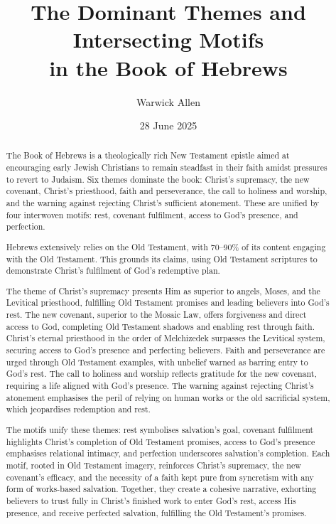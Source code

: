 \documentclass[12pt]{article}
\title{The Dominant Themes and Intersecting Motifs \\ in the Book of Hebrews}
\author{Warwick Allen}
\date{28 June 2025}
\begin{document}
\maketitle

\begin{abstract}
The Book of Hebrews is a theologically rich New Testament epistle aimed at
encouraging early Jewish Christians to remain steadfast in their faith amidst
pressures to revert to Judaism. Six themes dominate the book: Christ’s
supremacy, the new covenant, Christ’s priesthood, faith and perseverance, the
call to holiness and worship, and the warning against rejecting Christ’s
sufficient atonement. These are unified by four interwoven motifs: rest,
covenant fulfilment, access to God’s presence, and perfection.

Hebrews extensively relies on the Old Testament, with 70--90\% of its content
engaging with the Old Testament. This grounds its claims, using Old Testament
scriptures to demonstrate Christ’s fulfilment of God’s redemptive plan.

The theme of Christ’s supremacy presents Him as superior to angels, Moses, and
the Levitical priesthood, fulfilling Old Testament promises and leading
believers into God’s rest. The new covenant, superior to the Mosaic Law, offers
forgiveness and direct access to God, completing Old Testament shadows and
enabling rest through faith. Christ’s eternal priesthood in the order of
Melchizedek surpasses the Levitical system, securing access to God’s presence
and perfecting believers. Faith and perseverance are urged through Old
Testament examples, with unbelief warned as barring entry to God’s rest. The
call to holiness and worship reflects gratitude for the new covenant, requiring
a life aligned with God’s presence. The warning against rejecting Christ’s
atonement emphasises the peril of relying on human works or the old sacrificial
system, which jeopardises redemption and rest.

The motifs unify these themes: rest symbolises salvation’s goal, covenant
fulfilment highlights Christ’s completion of Old Testament promises, access to
God’s presence emphasises relational intimacy, and perfection underscores
salvation’s completion. Each motif, rooted in Old Testament imagery, reinforces
Christ’s supremacy, the new covenant’s efficacy, and the necessity of a faith
kept pure from syncretism with any form of works-based salvation. Together, they
create a cohesive narrative, exhorting believers to trust fully in Christ’s
finished work to enter God’s rest, access His presence, and receive perfected
salvation, fulfilling the Old Testament’s promises.
\end{abstract}
\end{document}
